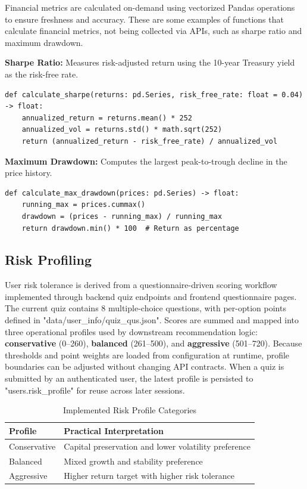 Financial metrics are calculated on-demand using vectorized Pandas operations to ensure freshness and accuracy. These are some examples of functions that calculate financial metrics, not being collected via APIs, such as sharpe ratio and maximum drawdown.

\textbf{Sharpe Ratio:}
Measures risk-adjusted return using the 10-year Treasury yield as the risk-free rate.
\begin{lstlisting}[style=pythonstyle, caption={Sharpe Ratio Calculation}, basicstyle=\ttfamily\footnotesize]
def calculate_sharpe(returns: pd.Series, risk_free_rate: float = 0.04) -> float:
    annualized_return = returns.mean() * 252
    annualized_vol = returns.std() * math.sqrt(252)
    return (annualized_return - risk_free_rate) / annualized_vol
\end{lstlisting}

\textbf{Maximum Drawdown:}
Computes the largest peak-to-trough decline in the price history.
\begin{lstlisting}[style=pythonstyle, caption={Maximum Drawdown Calculation}, basicstyle=\ttfamily\footnotesize]
def calculate_max_drawdown(prices: pd.Series) -> float:
    running_max = prices.cummax()
    drawdown = (prices - running_max) / running_max
    return drawdown.min() * 100  # Return as percentage
\end{lstlisting}

\subsection{Risk Profiling}

User risk tolerance is derived from a questionnaire-driven scoring workflow implemented through backend quiz endpoints and frontend questionnaire pages. The current quiz contains 8 multiple-choice questions, with per-option points defined in "data/user\_info/quiz\_qus.json". Scores are summed and mapped into three operational profiles used by downstream recommendation logic: \textbf{conservative} (0--260), \textbf{balanced} (261--500), and \textbf{aggressive} (501--720). Because thresholds and point weights are loaded from configuration at runtime, profile boundaries can be adjusted without changing API contracts. When a quiz is submitted by an authenticated user, the latest profile is persisted to "users.risk\_profile" for reuse across later sessions.

\begin{table}[H]
\centering
\begin{tabular}{ll}
\toprule
\textbf{Profile} & \textbf{Practical Interpretation} \\
\midrule
Conservative & Capital preservation and lower volatility preference \\
Balanced & Mixed growth and stability preference \\
Aggressive & Higher return target with higher risk tolerance \\
\bottomrule
\end{tabular}
\caption{Implemented Risk Profile Categories}
\label{tab:risk_profiles}
\end{table}

